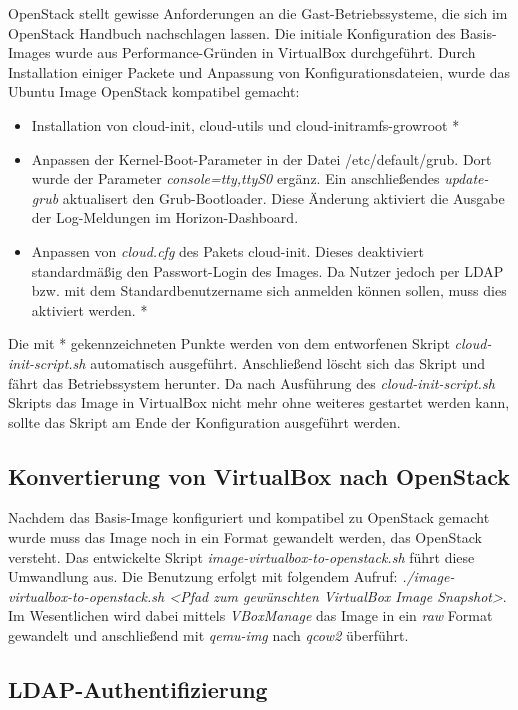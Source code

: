 OpenStack stellt gewisse Anforderungen an die Gast-Betriebssysteme, die sich im OpenStack Handbuch \cite{osImageRequirement} nachschlagen lassen. 
Die initiale Konfiguration des Basis-Images wurde aus Performance-Gründen in VirtualBox durchgeführt.
Durch Installation einiger Packete und Anpassung von Konfigurationsdateien, wurde das Ubuntu Image OpenStack kompatibel gemacht:

\begin{itemize}
\item Installation von cloud-init, cloud-utils und cloud-initramfs-growroot *
\item Anpassen der Kernel-Boot-Parameter in der Datei /etc/default/grub. Dort wurde der Parameter \emph{console=tty,ttyS0} ergänz. Ein anschließendes \emph{update-grub} aktualisert den Grub-Bootloader. Diese Änderung aktiviert die Ausgabe der Log-Meldungen im Horizon-Dashboard.
\item Anpassen von \emph{cloud.cfg} des Pakets cloud-init. Dieses deaktiviert standardmäßig den Passwort-Login des Images. Da Nutzer jedoch per LDAP bzw. mit dem Standardbenutzername sich anmelden können sollen, muss dies aktiviert werden. *
\end{itemize}

Die mit * gekennzeichneten Punkte werden von dem entworfenen Skript \emph{cloud-init-script.sh} automatisch ausgeführt. 
Anschließend löscht sich das Skript und fährt das Betriebssystem herunter.
Da nach Ausführung des \emph{cloud-init-script.sh} Skripts das Image in VirtualBox nicht mehr ohne weiteres gestartet werden kann, sollte das Skript am Ende der Konfiguration ausgeführt werden.

\subsection{Konvertierung von VirtualBox nach OpenStack}

Nachdem das Basis-Image konfiguriert und kompatibel zu OpenStack gemacht wurde muss das Image noch in ein Format gewandelt werden, das OpenStack versteht.
Das entwickelte Skript \emph{image-virtualbox-to-openstack.sh} führt diese Umwandlung aus. 
Die Benutzung erfolgt mit folgendem Aufruf: \emph{./image-virtualbox-to-openstack.sh <Pfad zum gewünschten VirtualBox Image Snapshot>}.
Im Wesentlichen wird dabei mittels \emph{VBoxManage} das Image in ein \emph{raw} Format gewandelt und anschließend mit \emph{qemu-img} nach \emph{qcow2} überführt.

\subsection{LDAP-Authentifizierung}

